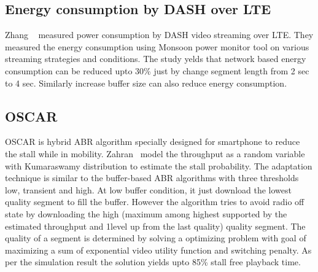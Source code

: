 \subsection{Energy consumption by DASH over LTE}
Zhang \etal\ \cite{10.1145/2910018.2910656} measured power consumption by DASH video streaming over LTE. They measured the energy consumption using Monsoon power monitor \cite{monsoonmonitor} tool on various streaming strategies and conditions. The study yelds that network based energy consumption can be reduced upto 30\% just by change segment length from 2 sec to 4 sec. Similarly increase buffer size can also reduce energy consumption.

\subsection{OSCAR}
OSCAR\cite{10.1145/2910018.2910655} is hybrid ABR algorithm specially designed for smartphone to reduce the stall while in mobility. Zahran \etal\ model the throughput as a random variable with Kumaraswamy distribution \cite{jones2009kumaraswamy} to estimate the stall probability. The adaptation technique is similar to the buffer-based ABR algorithms with three thresholds low, transient and high. At low buffer condition, it just download the lowest quality segment to fill the buffer. However the algorithm tries to avoid radio off state by downloading the high (maximum among highest supported by the estimated throughput and 1level up from the last quality) quality segment. The quality of a segment is determined by solving a optimizing problem with goal of maximizing a sum of exponential video utility function and switching penalty. As per the simulation result the solution yields upto 85\% stall free playback time.